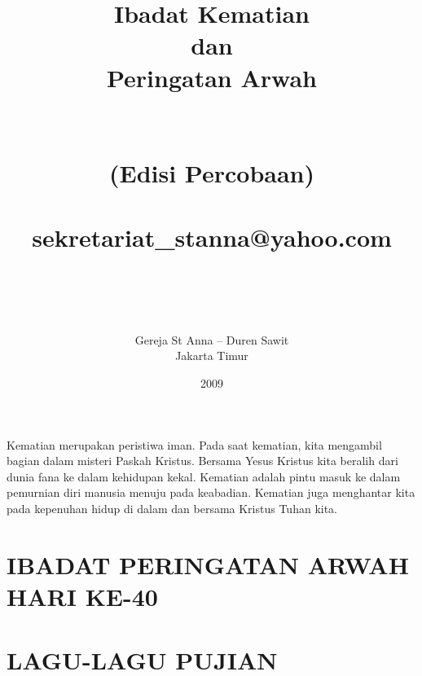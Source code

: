 \documentclass[10pt,a5paper,openany,fancyhdr]{memoir}
\author{Gereja St Anna -- Duren Sawit \\  
Jakarta Timur}
\title{Ibadat Kematian\\ 
dan \\
Peringatan Arwah \\
{~}\\
\vspace{2cm}
~\\
(Edisi Percobaan) \\
~\\
sekretariat\_stanna@yahoo.com \\
~\\
~\\
}
\date{2009}
\begin{document}
\pagestyle{Ruled}
\begin{titlingpage}
\maketitle
\end{titlingpage}

Kematian merupakan peristiwa iman. Pada saat kematian, kita mengambil 
bagian dalam misteri Paskah Kristus. Bersama Yesus Kristus kita beralih 
dari dunia fana ke dalam kehidupan kekal. Kematian adalah pintu masuk ke 
dalam pemurnian diri manusia menuju pada keabadian. Kematian juga 
menghantar kita pada kepenuhan hidup di dalam dan bersama Kristus 
Tuhan kita. 

 



\renewcommand{\cftchapterfont}{\normalfont\rmfamily}   
\renewcommand{\cftsectionfont}{\normalfont\rmfamily}   
\newpage
\tableofcontents



\chapter{IBADAT PERINGATAN ARWAH HARI KE-40} 


\chapter*{LAGU-LAGU PUJIAN}

\end{document}
